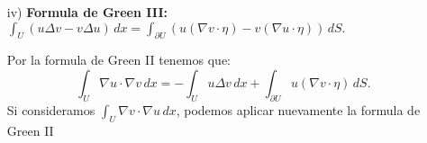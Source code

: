 \documentclass{article}
\begin{document}
\begin{homeworkProblem}[1]
\begin{itemize}
\begin{solucion}
\begin{align*}
                &=\sum_{i=1}^n\int_U(\partial_{x_i}u)(\partial_{x_i}v)\,dx.
            \end{align*}
            Ahora, apliquemos la formula de integración por partes a la integral dentro de la sumatoria
            $$\int_U(\partial_{x_i}u)(\partial_{x_i}v)\,dx=\int_{\partial U}(u\partial_{x_i}v)\eta_i\,dS-\int_Uu(\partial_{x_i}^2v)\,dx.$$
            Reemplazando en la sumatoria, reordenando los términos y usando nuevamente la linealidad, tenemos:
            \begin{align*}
             \sum_{i=1}^n\int_U(\partial_{x_i}u)(\partial_{x_i}v)\,dx&=\sum_{i=1}^n\left(\int_{\partial U}(u\partial_{x_i}v)\eta_i\,dS-\int_Uu(\partial_{x_i}^2v)\,dx\right)\\
             &=\sum_{i=1}^n\left(-\int_Uu(\partial_{x_i}^2v)\,dx\right)+\sum_{i=1}^n\left(\int_{\partial U}(u\partial_{x_i}v)\eta_i\,dS\right)\\
             &=-\int_U\left(\sum_{i=1}^nu(\partial_{x_i}^2v)\right)\,dx+\int_{\partial U}\left(\sum_{i=1}^n(u\partial_{x_i}v)\eta_i\right)\,dS.
            \end{align*}
            Note que cada sumatoria la podemos reescribir como:
            \begin{align*}
              \sum_{i=1}^nu(\partial_{x_i}^2v)&=u\sum_{i=1}^n(\partial_{x_i}^2v)=u\Delta v,\\
              \sum_{i=1}^n(u\partial_{x_i}v)\eta_i&=u\sum_{i=1}^n(\partial_{x_i}v)\eta_i=u(\nabla v\cdot\eta).
            \end{align*}
            Luego, reemplazando en la expresión obtenida:
            $$-\int_U\left(\sum_{i=1}^nu(\partial_{x_i}^2v)\right)\,dx+\int_{\partial U}\left(\sum_{i=1}^n(u\partial_{x_i}v)\eta_i\right)\,dS=-\int_Uu\Delta v\,dx+\int_{\partial U}u(\nabla v\cdot\eta)\,dS.$$
            Así hemos mostrado que:
            $$\int_U\nabla u\cdot\nabla v\,dx=-\int_U u\Delta v\,dx+\int_{\partial U}u(\nabla v\cdot\eta)\,dS.$$
            \qed
        \end{solucion}
        \item [iv)] \textbf{Formula de Green III: }$\int_{U}(u\Delta v-v\Delta u)\,dx=\int_{\partial U}\left(u(\nabla v\cdot\eta)-v(\nabla u\cdot\eta)\right)\,dS.$
        \begin{solucion}
            Por la formula de Green II tenemos que:
            $$\int_U\nabla u\cdot\nabla v\,dx=-\int_U u\Delta v\,dx+\int_{\partial U}u(\nabla v\cdot\eta)\,dS.$$
            Si consideramos $\int_{U}\nabla v\cdot\nabla u\,dx$, podemos aplicar nuevamente la formula de Green II

\end{solucion}
\end{itemize}
\end{homeworkProblem}
\end{document}
